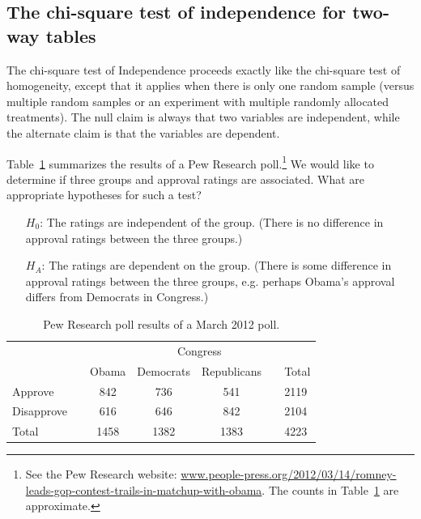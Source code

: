 

\subsection{The chi-square test of independence for two-way tables}

The chi-square test of Independence proceeds exactly like the chi-square test of homogeneity, except that it applies when there is only one random sample (versus multiple random samples or an experiment with multiple randomly allocated treatments). The null claim is always that two variables are independent, while the alternate claim is that the variables are dependent.

\begin{example}{Table~\ref{pewResearchPollOnApprovalRatingsForChiSquareSectionExampleAndExercises} summarizes the results of a Pew Research poll.\footnote{See the Pew Research website: {\scriptsize\href{http://www.people-press.org/2012/03/14/romney-leads-gop-contest-trails-in-matchup-with-obama/}{www.people-press.org/2012/03/14/romney-leads-gop-contest-trails-in-matchup-with-obama}}. The counts in Table~\ref{pewResearchPollOnApprovalRatingsForChiSquareSectionExampleAndExercises} are approximate.} We would like to determine if three groups and approval ratings are associated. What are appropriate hypotheses for such a test?}\label{hypothesisTestSetupForPewResearchPollOnApprovalRatingsForChiSquareSection}
\begin{itemize}
\item[$H_0$:] The ratings are independent of the group. (There is no difference in approval ratings between the three groups.)
\item[$H_A$:] The ratings are dependent on the group. (There is some difference in approval ratings between the three groups, e.g. perhaps Obama's approval differs from Democrats in Congress.)
\end{itemize}
\end{example}

\begin{table}
\centering
\begin{tabular}{ll ccc ll}
& & & \multicolumn{2}{c}{Congress} & \\
\cline{4-5}
 & \hspace{1mm} & Obama & Democrats & Republicans & \hspace{1mm} & Total \\
\hline
Approve				   & & 842    & 736 & 541   & 				& 2119 \\
Disapprove			   & & 616    & 646 & 842   &				& 2104 \\
\hline
Total					   & & 1458    & 1382 & 1383 & 				& 4223 \\
\hline
\end{tabular}
\caption{Pew Research poll results of a March 2012 poll.}
\label{pewResearchPollOnApprovalRatingsForChiSquareSectionExampleAndExercises}
\end{table}

